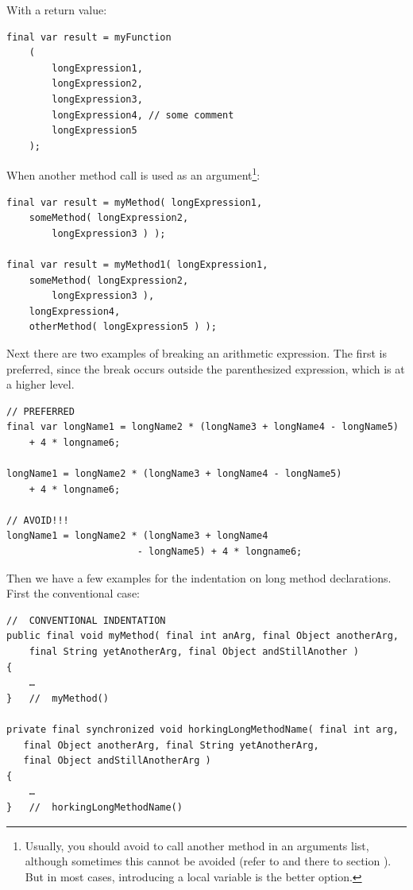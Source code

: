 With a return value:
\begin{lstlisting}
final var result = myFunction
    ( 
        longExpression1,
        longExpression2,
        longExpression3,
        longExpression4, // some comment
        longExpression5
    );
\end{lstlisting}

When another method call is used as an argument\footnote{Usually, you should avoid to call another method in an arguments list, although sometimes this cannot be avoided (refer to  and there to section ). But in most cases, introducing a local variable is the better option.}:
\begin{lstlisting}
final var result = myMethod( longExpression1,
    someMethod( longExpression2,
        longExpression3 ) );

final var result = myMethod1( longExpression1,
    someMethod( longExpression2,
        longExpression3 ),
    longExpression4,
    otherMethod( longExpression5 ) );
\end{lstlisting}

Next there are two examples of breaking an arithmetic expression. The first is preferred, since the break occurs outside the parenthesized expression, which is at a higher level.
\begin{lstlisting}
// PREFERRED
final var longName1 = longName2 * (longName3 + longName4 - longName5)
    + 4 * longname6;
           
longName1 = longName2 * (longName3 + longName4 - longName5)
    + 4 * longname6;
           
// AVOID!!!           
longName1 = longName2 * (longName3 + longName4
                       - longName5) + 4 * longname6;
\end{lstlisting}

Then we have a few examples for the indentation on long method declarations. First the conventional case:
\begin{lstlisting}
//  CONVENTIONAL INDENTATION
public final void myMethod( final int anArg, final Object anotherArg,
    final String yetAnotherArg, final Object andStillAnother )
{
    …
}   //  myMethod()

private final synchronized void horkingLongMethodName( final int arg,
   final Object anotherArg, final String yetAnotherArg, 
   final Object andStillAnotherArg )
{
    …
}   //  horkingLongMethodName()
\end{lstlisting}

